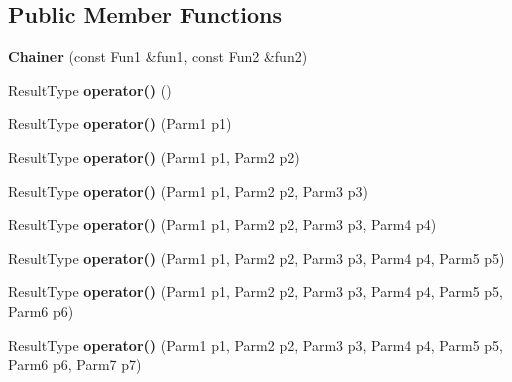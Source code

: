 \subsection*{Public Member Functions}
\begin{DoxyCompactItemize}
\item 
\hypertarget{classLoki_1_1Chainer_ae3c0b4edc94b51c3aa7e1eca072c219f}{}{\bfseries Chainer} (const Fun1 \&fun1, const Fun2 \&fun2)\label{classLoki_1_1Chainer_ae3c0b4edc94b51c3aa7e1eca072c219f}

\item 
\hypertarget{classLoki_1_1Chainer_ade8289d13e0dd435b6033373c2fb7d5d}{}Result\+Type {\bfseries operator()} ()\label{classLoki_1_1Chainer_ade8289d13e0dd435b6033373c2fb7d5d}

\item 
\hypertarget{classLoki_1_1Chainer_a1eaca2a74bca42a96da54679c17369f0}{}Result\+Type {\bfseries operator()} (Parm1 p1)\label{classLoki_1_1Chainer_a1eaca2a74bca42a96da54679c17369f0}

\item 
\hypertarget{classLoki_1_1Chainer_afa17b96b8f98fffe5656720f960bb26b}{}Result\+Type {\bfseries operator()} (Parm1 p1, Parm2 p2)\label{classLoki_1_1Chainer_afa17b96b8f98fffe5656720f960bb26b}

\item 
\hypertarget{classLoki_1_1Chainer_af74f303c2d046330b7f932df44bbd0ea}{}Result\+Type {\bfseries operator()} (Parm1 p1, Parm2 p2, Parm3 p3)\label{classLoki_1_1Chainer_af74f303c2d046330b7f932df44bbd0ea}

\item 
\hypertarget{classLoki_1_1Chainer_afdabe49ee44304f6ef2e2b65f27c3e34}{}Result\+Type {\bfseries operator()} (Parm1 p1, Parm2 p2, Parm3 p3, Parm4 p4)\label{classLoki_1_1Chainer_afdabe49ee44304f6ef2e2b65f27c3e34}

\item 
\hypertarget{classLoki_1_1Chainer_a090b79389ea967f8a5b52f35da76e379}{}Result\+Type {\bfseries operator()} (Parm1 p1, Parm2 p2, Parm3 p3, Parm4 p4, Parm5 p5)\label{classLoki_1_1Chainer_a090b79389ea967f8a5b52f35da76e379}

\item 
\hypertarget{classLoki_1_1Chainer_a97f1f019d922748402b26c181deb90e6}{}Result\+Type {\bfseries operator()} (Parm1 p1, Parm2 p2, Parm3 p3, Parm4 p4, Parm5 p5, Parm6 p6)\label{classLoki_1_1Chainer_a97f1f019d922748402b26c181deb90e6}

\item 
\hypertarget{classLoki_1_1Chainer_adbe43c45bccf930ee762ac343dbd7917}{}Result\+Type {\bfseries operator()} (Parm1 p1, Parm2 p2, Parm3 p3, Parm4 p4, Parm5 p5, Parm6 p6, Parm7 p7)\label{classLoki_1_1Chainer_adbe43c45bccf930ee762ac343dbd7917}


\end{DoxyCompactItemize}
